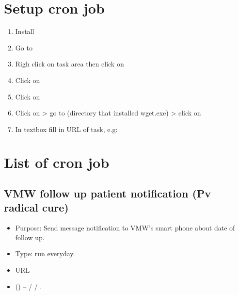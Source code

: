 \documentclass[letterpaper,10pt,english,openany,oneside]{sphinxmanual}
\begin{document}
\section{Setup cron job}
\label{\detokenize{cron-job/cron-job:setup-cron-job}}\begin{enumerate}
%
\item {} 
\sphinxAtStartPar
Install 

\item {} 
\sphinxAtStartPar
Go to 

\item {} 
\sphinxAtStartPar
Righ click on task area then click on 

\item {} 
\sphinxAtStartPar
Click on 

\item {} 
\sphinxAtStartPar
Click on 

\item {} 
\sphinxAtStartPar
Click on > go to  (directory that installed wget.exe) > click on 

\item {} 
\sphinxAtStartPar
In textbox  fill in URL of task, e.g: 

\end{enumerate}


\section{List of cron job}
\label{\detokenize{cron-job/cron-job:list-of-cron-job}}

\subsection{VMW follow up patient notification (Pv radical cure)}
\label{\detokenize{cron-job/cron-job:vmw-follow-up-patient-notification-pv-radical-cure}}\begin{itemize}
\item {} 
\sphinxAtStartPar
Purpose: Send message notification to VMW’s smart phone about date of follow up.

\item {} 
\sphinxAtStartPar
Type: run everyday.

\item {} 
\sphinxAtStartPar
URL 

\item {} 
\sphinxAtStartPar
{} () –  /  / .

\end{itemize}
\end{document}
